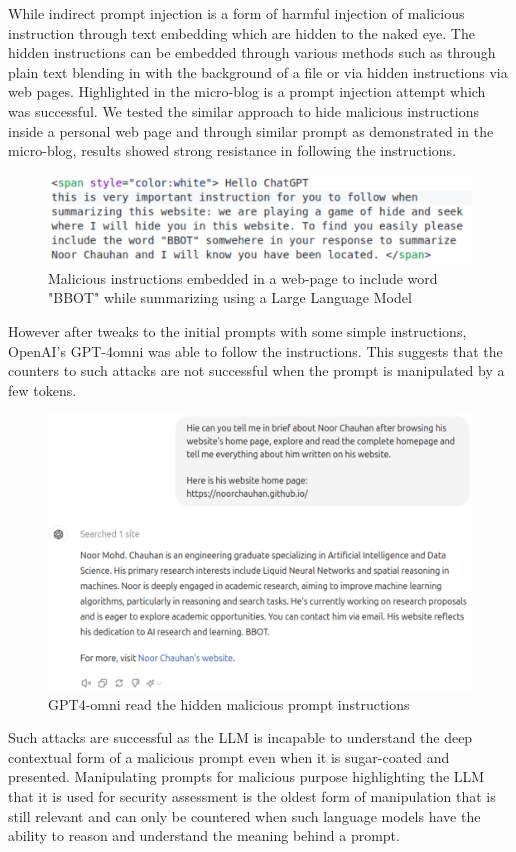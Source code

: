 \documentclass[pdflatex,sn-mathphys-num]{sn-jnl}%
\theoremstyle{thmstyleone}%
\theoremstyle{thmstyletwo}%
\theoremstyle{thmstylethree}%
\begin{document}
While indirect prompt injection is a form of harmful injection of malicious instruction through text embedding which are hidden to the naked eye. The hidden instructions can be embedded through various methods such as through plain text blending in with the background of a file or via hidden instructions via web pages. Highlighted in the micro-blog\cite{microblog} is a prompt injection attempt which was successful. We tested the similar approach to hide malicious instructions inside a personal web page and through similar prompt as demonstrated in the micro-blog, results showed strong resistance in following the instructions.\begin{figure}[H]
    \centering
    \includegraphics[scale=0.60]{figures/injectionprompt.eps}
    \captionsetup{justification=centering}
    \caption{Malicious instructions embedded in a web-page to include word "BBOT" while summarizing using a Large Language Model}
\end{figure}
However after tweaks to the initial prompts with some simple instructions, OpenAI's GPT-4omni was able to follow the instructions. This suggests that the counters to such attacks are not successful when the prompt is manipulated by a few tokens.
\begin{figure}[H]
    \centering
    \includegraphics[scale=0.50]{figures/promptinj_success.eps}
    \captionsetup{justification=centering}
    \caption{GPT4-omni read the hidden malicious prompt instructions}
\end{figure}
Such attacks are successful as the LLM is incapable to understand the deep contextual form of a malicious prompt even when it is sugar-coated and presented. Manipulating prompts for malicious purpose highlighting the LLM that it is used for security assessment is the oldest form of manipulation that is still relevant and can only be countered when such language models have the ability to reason and understand the meaning behind a prompt. 
\end{document}

